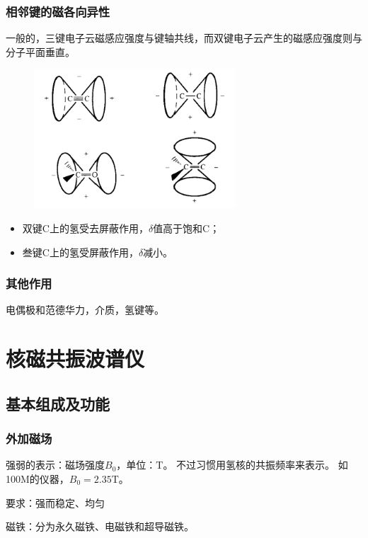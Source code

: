 \subsubsection{相邻键的磁各向异性}
一般的，三键电子云磁感应强度与键轴共线，而双键电子云产生的磁感应强度则与分子平面垂直。
\begin{figure}[!h]
	\centering
	\includegraphics[width=0.6\linewidth]{image/chp6_doubletriplebond}
	\label{fig:chp6doubletriplebond}
\end{figure}

\begin{itemize}
	\item 双键C上的氢受去屏蔽作用，$\delta$值高于饱和C；
	\item 叁键C上的氢受屏蔽作用，$\delta$减小。
\end{itemize}

\subsubsection{其他作用}
电偶极和范德华力，介质，氢键等。

\section{核磁共振波谱仪}

\subsection{基本组成及功能}
\subsubsection{外加磁场}
强弱的表示：磁场强度$B_0$，单位：$\mathrm{T}$。
不过习惯用氢核的共振频率来表示。
	如100M的仪器，$B_0=2.35\mathrm{T}$。

要求：强而稳定、均匀

磁铁：分为永久磁铁、电磁铁和超导磁铁。

